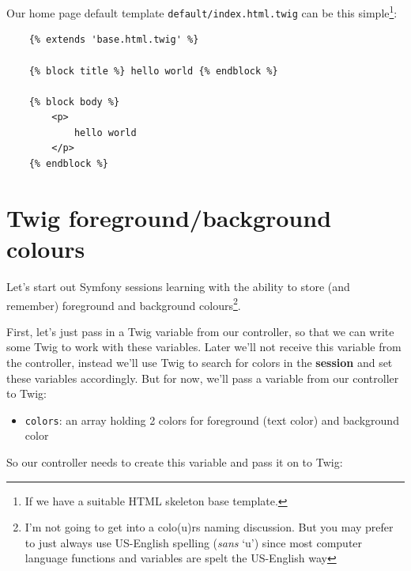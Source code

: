 \documentclass[a4paperpaper,openright]{book}
\newenvironment{Shaded}{}{}
\newcommand{\KeywordTok}[1]{\textcolor[rgb]{0.00,0.44,0.13}{\textbf{#1}}}
\newcommand{\NormalTok}[1]{#1}
\newcommand{\OtherTok}[1]{\textcolor[rgb]{0.00,0.44,0.13}{#1}}
\newcommand{\StringTok}[1]{\textcolor[rgb]{0.25,0.44,0.63}{#1}}
\begin{document}
Our home page default template \texttt{default/index.html.twig} can be
this simple\footnote{If we have a suitable HTML skeleton base template.}:

\begin{verbatim}
    {% extends 'base.html.twig' %}

    {% block title %} hello world {% endblock %}

    {% block body %}
        <p>
            hello world
        </p>
    {% endblock %}
\end{verbatim}

\hypertarget{twig-foregroundbackground-colours}{%
\section{Twig foreground/background
colours}\label{twig-foregroundbackground-colours}}

Let's start out Symfony sessions learning with the ability to store (and
remember) foreground and background colours\footnote{I'm not going to
  get into a colo(u)rs naming discussion. But you may prefer to just
  always use US-English spelling (\emph{sans} `u') since most computer
  language functions and variables are spelt the US-English way}.

First, let's just pass in a Twig variable from our controller, so that
we can write some Twig to work with these variables. Later we'll not
receive this variable from the controller, instead we'll use Twig to
search for colors in the \textbf{session} and set these variables
accordingly. But for now, we'll pass a variable from our controller to
Twig:

\begin{itemize}
\item
  \texttt{colors}: an array holding 2 colors for foreground (text color)
  and background color

\begin{Shaded}
\end{Shaded}
\end{itemize}

So our controller needs to create this variable and pass it on to Twig:
\end{document}
